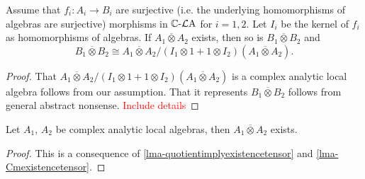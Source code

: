 \begin{lemma}\label{lma-quotientimplyexistencetensor}
    Assume that $f_i:A_i\rightarrow B_i$ are  surjective (i.e. the underlying homomorphisms of algebras are surjective) morphisms in $\mathbb{C}\text{-}\mathcal{L}\mathrm{A}$ for $i=1,2$. Let $I_i$ be the kernel of $f_i$ as homomorphisms of algebras.
    If $A_1\overline{\otimes} A_2$ exists, then so is $B_1 \overline{\otimes} B_2$ and
    \[
        B_1 \overline{\otimes} B_2\cong A_1\overline{\otimes} A_2/ (I_1\otimes 1+1\otimes I_2)(A_1\overline{\otimes} A_2).
    \]
\end{lemma}
\begin{proof}
    That $A_1\overline{\otimes} A_2/ (I_1\otimes 1+1\otimes I_2)(A_1\overline{\otimes} A_2)$ is a complex analytic local algebra follows from our assumption. That it represents  $B_1 \overline{\otimes} B_2$ follows from general abstract nonsense. \textcolor{red}{Include details}
\end{proof}

\begin{corollary}
    Let $A_1$, $A_2$ be complex analytic local algebras, then $A_1\overline{\otimes} A_2$ exists. 
\end{corollary}
\begin{proof}
    This is a consequence of \cref{lma-quotientimplyexistencetensor} and \cref{lma-Cmexistencetensor}.
\end{proof}

